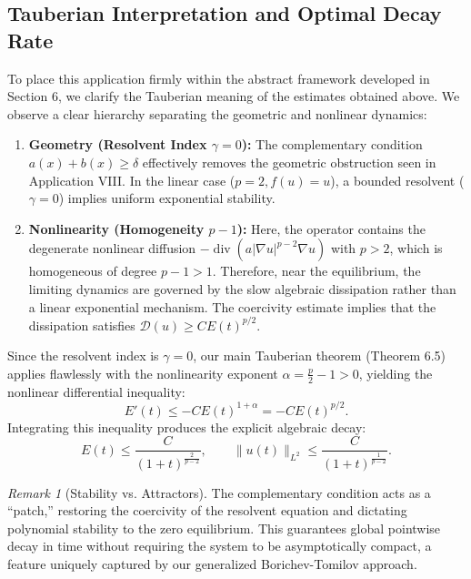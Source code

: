 \documentclass[11pt,reqno]{amsart}
\theoremstyle{remark}
\newtheorem{remark}[theorem]{Remark}
\begin{document}
\subsection{Tauberian Interpretation and Optimal Decay Rate}
To place this application firmly within the abstract framework developed in Section 6, we clarify the Tauberian meaning of the estimates obtained above. We observe a clear hierarchy separating the geometric and nonlinear dynamics:

\begin{enumerate}
    \item \textbf{Geometry (Resolvent Index $\gamma=0$):} The complementary condition $a(x) + b(x) \ge \delta$ effectively removes the geometric obstruction seen in Application VIII. In the linear case ($p=2, f(u)=u$), a bounded resolvent ($\gamma=0$) implies uniform exponential stability.

    \item \textbf{Nonlinearity (Homogeneity $p-1$):} Here, the operator contains the degenerate nonlinear diffusion $-\operatorname{div}(a|\nabla u|^{p-2}\nabla u)$ with $p>2$, which is homogeneous of degree $p-1 > 1$. Therefore, near the equilibrium, the limiting dynamics are governed by the slow algebraic dissipation rather than a linear exponential mechanism. The coercivity estimate implies that the dissipation satisfies $\mathcal{D}(u) \ge C E(t)^{p/2}$.
\end{enumerate}

Since the resolvent index is $\gamma=0$, our main Tauberian theorem (Theorem 6.5) applies flawlessly with the nonlinearity exponent $\alpha = \frac{p}{2}-1 > 0$, yielding the nonlinear differential inequality:
\[
    E'(t) \le -C E(t)^{1+\alpha} = -C E(t)^{p/2}.
\]
Integrating this inequality produces the explicit algebraic decay:
\begin{equation}
    E(t) \le \frac{C}{(1+t)^{\frac{2}{p-2}}}, \qquad \|u(t)\|_{L^2} \le \frac{C}{(1+t)^{\frac{1}{p-2}}}.
\end{equation}

\begin{remark}[Stability vs. Attractors]
The complementary condition acts as a ``patch,'' restoring the coercivity of the resolvent equation and dictating polynomial stability to the zero equilibrium. This guarantees global pointwise decay in time without requiring the system to be asymptotically compact, a feature uniquely captured by our generalized Borichev-Tomilov approach.
\end{remark}
\end{document}
